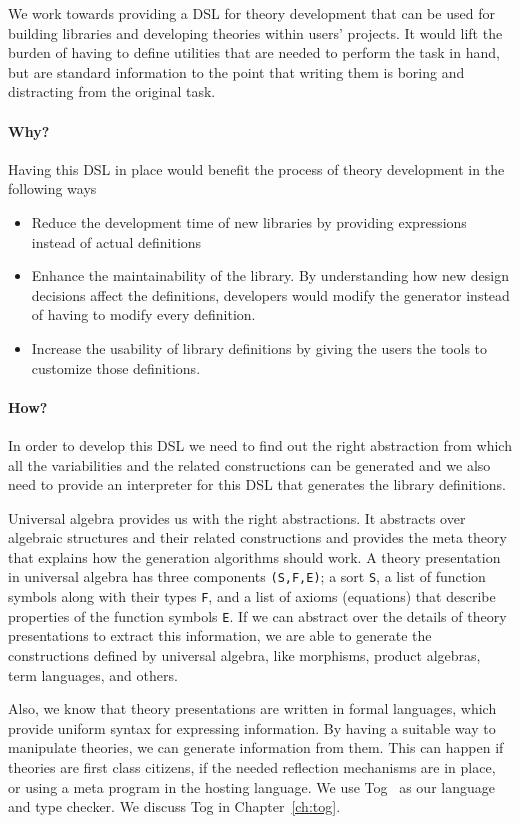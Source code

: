 We work towards providing a DSL for theory development that can be used for building libraries and developing theories within users' projects. It would lift the burden of having to define utilities that are needed to perform the task in hand, but are standard information to the point that writing them is boring and distracting from the original task. 

\paragraph{Why?}
Having this DSL in place would benefit the process of theory development in the following ways 
\begin{itemize}
    \item Reduce the development time of new libraries by providing expressions instead of actual definitions 
    \item Enhance the maintainability of the library. By understanding how new design decisions affect the definitions, developers would modify the generator instead of having to modify every definition. 
    \item Increase the usability of library definitions by giving the users the tools to customize those definitions.  
\end{itemize}  

\paragraph{How?}
In order to develop this DSL we need to find out the right abstraction from which all the variabilities and the related constructions can be generated and we also need to provide an interpreter for this DSL that generates the library definitions. 

Universal algebra provides us with the right abstractions. It abstracts over algebraic structures and their related constructions and provides the meta theory that explains how the generation algorithms should work. A theory presentation in universal algebra has three components \verb|(S,F,E)|; a sort \verb|S|, a list of function symbols along with their types \verb|F|, and a list of axioms (equations) that describe properties of the function symbols \verb|E|. If we can abstract over the details of theory presentations to extract this information, we are able to generate the constructions defined by universal algebra, like morphisms, product algebras, term languages, and others. 


Also, we know that theory presentations are written in formal languages, which provide uniform syntax for expressing information. By having a suitable way to manipulate theories, we can generate information from them. This can happen if theories are first class citizens, if the needed reflection mechanisms are in place, or using a meta program in the hosting language. We use Tog~\cite{tog} as our language and type checker. We discuss Tog in Chapter~\ref{ch:tog}. 

